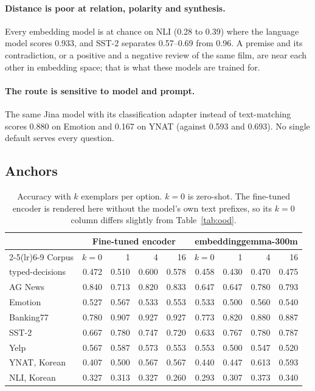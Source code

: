 \documentclass[11pt]{article}
\begin{document}
\paragraph{Distance is poor at relation, polarity and synthesis.} Every
embedding model is at chance on NLI (0.28 to 0.39) where the language model
scores 0.933, and SST-2 separates 0.57--0.69 from 0.96. A premise and its
contradiction, or a positive and a negative review of the same film, are near
each other in embedding space; that is what these models are trained for.

\paragraph{The route is sensitive to model and prompt.} The same Jina model
with its classification adapter instead of text-matching scores 0.880 on
Emotion and 0.167 on YNAT (against 0.593 and 0.693). No single default serves
every question.

\subsection{Anchors}

\begin{table}[h]\centering
\begin{tabular}{lrrrrrrrr}
\toprule
 & \multicolumn{4}{c}{Fine-tuned encoder} & \multicolumn{4}{c}{embeddinggemma-300m} \\
\cmidrule(lr){2-5}\cmidrule(lr){6-9}
Corpus & $k{=}0$ & 1 & 4 & 16 & $k{=}0$ & 1 & 4 & 16 \\
\midrule
typed-decisions & 0.472 & 0.510 & 0.600 & 0.578 & 0.458 & 0.430 & 0.470 & 0.475 \\
AG News & 0.840 & 0.713 & 0.820 & 0.833 & 0.647 & 0.647 & 0.780 & 0.793 \\
Emotion & 0.527 & 0.567 & 0.533 & 0.553 & 0.533 & 0.500 & 0.560 & 0.540 \\
Banking77 & 0.780 & 0.907 & 0.927 & 0.927 & 0.773 & 0.820 & 0.880 & 0.887 \\
SST-2 & 0.667 & 0.780 & 0.747 & 0.720 & 0.633 & 0.767 & 0.780 & 0.787 \\
Yelp & 0.567 & 0.587 & 0.573 & 0.553 & 0.553 & 0.500 & 0.547 & 0.520 \\
YNAT, Korean & 0.407 & 0.500 & 0.567 & 0.567 & 0.440 & 0.447 & 0.613 & 0.593 \\
NLI, Korean & 0.327 & 0.313 & 0.327 & 0.260 & 0.293 & 0.307 & 0.373 & 0.340 \\
\bottomrule
\end{tabular}
\caption{Accuracy with $k$ exemplars per option. $k{=}0$ is zero-shot. The
fine-tuned encoder is rendered here without the model's own text prefixes, so
its $k{=}0$ column differs slightly from Table~\ref{tab:ood}.}
\label{tab:anchor}
\end{table}
\end{document}
